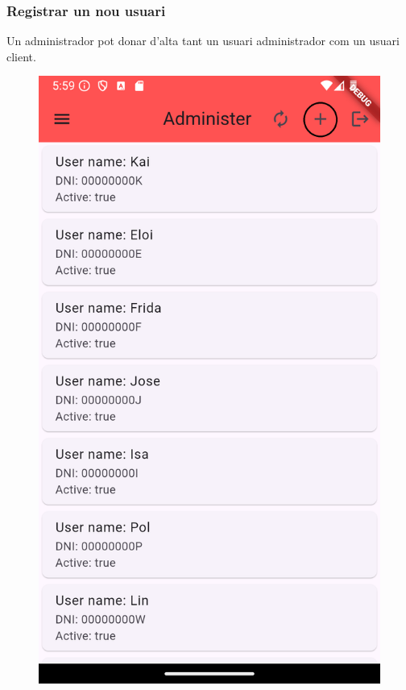 \documentclass[a4paper,12pt,twoside]{ThesisStyle}
\begin{document}
\clearpage
\subsubsection{Registrar un nou usuari}
\label{subsubsec: Registrar un nou usuari}


Un administrador pot donar d'alta tant un usuari administrador com un usuari client.

\begin{figure}[h]
    \centering
    \begin{minipage}{0.31\textwidth}
        \includegraphics[width=\linewidth]{imatges/adminadd.png}

\end{minipage}
\end{figure}
\end{document}
